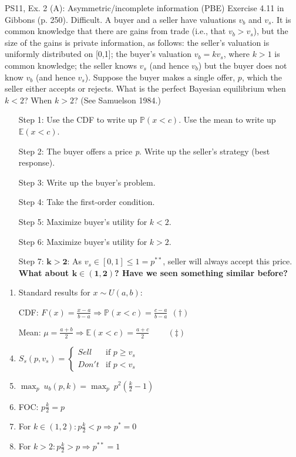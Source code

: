 \begin{frame}{PS11, Ex. 2 (A): Asymmetric/incomplete information (PBE)}
    Exercise 4.11 in Gibbons (p. 250). Difficult. A buyer and a seller have valuations $v_b$ and $v_s$. It is common knowledge that there are gains from trade (i.e., that $v_b > v_s$), but the size of the gains is private information, as follows: the seller’s valuation is uniformly distributed on [0,1]; the buyer’s valuation $v_b = kv_s$, where $k > 1$ is common knowledge; the seller knows $v_s$ (and hence $v_b$) but the buyer does not know $v_b$ (and hence $v_s$). Suppose the buyer makes a single offer, $p$, which the seller either accepts or rejects. What is the perfect Bayesian equilibrium when $k < 2$? When $k > 2$? (See Samuelson 1984.) \vspace{-8pt}
    \begin{multicols}{2}
      \begin{itemize}
        \item[Step 1:] Use the CDF to write up $\mathbb{P}(x<c)$. Use the mean to write up $\mathbb{E}(x<c)$.
        \item[Step 2:] The buyer offers a price \textit{p}. Write up the seller's strategy (best response).
        \item[Step 3:] Write up the buyer's problem.
        \item[Step 4:] Take the first-order condition.
        \item[Step 5:] Maximize buyer's utility for $k<2$.
        \item[Step 6:] Maximize buyer's utility for $k>2$.
        \item[Step 7:] $\bm{k>2}$: As $v_s\in[0,1]\leq1=p^{**}$, seller will always accept this price.\\
        \textbf{What about $\bm{k\in(1,2)}$? Have we seen something similar before?}
      \end{itemize}
      \vfill\null\columnbreak
      \begin{enumerate}
        \item Standard results for $x\sim U(a, b):$
        \item[CDF:] $F(x)=\frac{x-a}{b-a}\Rightarrow\mathbb{P}(x<c)=\frac{c-a}{b-a}\ \ (\dagger)$
        \item[Mean:] $\mu=\frac{a+b}{2}\Rightarrow\mathbb{E}(x<c)=\frac{a+c}{2}\quad\quad\ (\ddagger)$
        \item $S_s(p,v_s)=\left\{\begin{array}{ll}
          Sell  & \text{if }p\geq v_s \\
          Don't & \text{if }p < v_s
        \end{array}\right.$
        \item $\displaystyle{\max_p}\ u_b(p,k)=\displaystyle{\max_p}\ p^2\left(\frac{k}{2}-1\right)$
        \item FOC: $p\frac{k}{2}=p$
        \item For $k\in(1,2): p\frac{k}{2}<p\Rightarrow p^*=0$
        \item For $k>2: p\frac{k}{2}>p\Rightarrow p^{**}=1$
      \end{enumerate}
      \vfill\null
    \end{multicols}
\end{frame}
